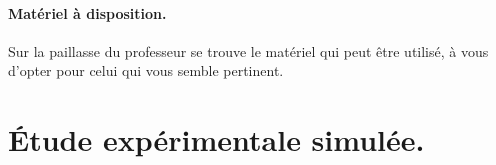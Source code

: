 \documentclass[12pt,a4paper]{article}
\begin{document}
\paragraph*{Matériel à disposition.}
Sur la paillasse du professeur se trouve le matériel qui peut être utilisé, à vous d'opter pour celui qui vous semble pertinent.

\begin{figure}
	\centering
\end{figure}
\newpage
\section{Étude expérimentale simulée.}
\end{document}
